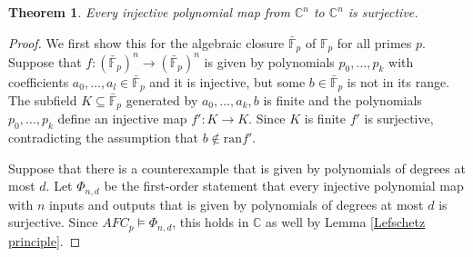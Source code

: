 \documentclass[a4paper, 11pt]{amsart}
\newtheorem{theorem}{Theorem}[subsection]
\theoremstyle{remark}
\newtheorem{problem}[]{Problem}
\newcommand{\ran}{\mathrm{ran}}
\begin{document}
\begin{theorem} 
Every injective polynomial map from $\mathbb{C}^n$ to $\mathbb{C}^n$ is surjective.
\end{theorem} 
\begin{proof} 
We first show this for the algebraic closure $\bar{\mathbb{F}}_p$ of $\mathbb{F}_p$ for all primes $p$. Suppose that $f\colon (\bar{\mathbb{F}}_p)^n\rightarrow (\bar{\mathbb{F}}_p)^n$ is given by polynomials $p_0,\dots,p_k$ 
with coefficients $a_0,\dots,a_l\in \bar{\mathbb{F}}_p$ and it is injective, but some $b\in \bar{\mathbb{F}}_p$ is not in its range. The subfield $K\subseteq \bar{\mathbb{F}}_p$ generated by $a_0,\dots,a_k,b$ is finite and the polynomials $p_0,\dots,p_k$ define an injective map $f'\colon K\rightarrow K$. Since $K$ is finite $f'$ is surjective, contradicting the assumption that $b\notin \ran{f'}$. 

Suppose that there is a counterexample that is given by polynomials of degrees at most $d$. Let $\Phi_{n,d}$ be the first-order statement that every injective polynomial map with $n$ inputs and outputs that is given by polynomials of degrees at most $d$ is surjective. Since $AFC_p\models \Phi_{n,d}$, this holds in $\mathbb{C}$ as well by Lemma \ref{Lefschetz principle}. 
\end{proof} 









\iffalse
\end{document}

